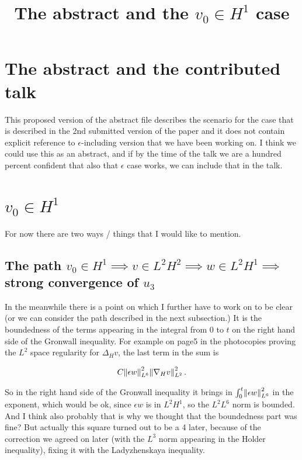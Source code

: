 \documentclass[11pt]{article}
\title{The abstract and the $v_0 \in H^1$ case}
\date{}
\begin{document}
\maketitle

\section{The abstract and the contributed talk}

This proposed version of the abstract file describes the scenario for the case that is described in the 2nd submitted version of the paper and it does not contain explicit reference to $\epsilon$-including version that we have been working on. I think we could use this as an abstract, and if by the time of the talk we are a hundred percent confident that also that $\epsilon$ case works, we can include that in the talk.

\section{$v_0 \in H^1$}

For now there are two ways / things that I would like to mention.

  \subsection{The path $v_0 \in H^1 \implies v \in L^2 H^2 \implies w \in L^2 H^1 \implies$ strong convergence of $u_3$}
  
  In the meanwhile there is a point on which I further have to work on to be clear (or we can consider the path described in the next subsection.) It is the boundedness of the terms appearing in the integral from $0$ to $t$ on the right hand side of the Gronwall inequality. For example on page5 in the photocopies proving the $L^2$ space regularity for $\Delta_H v$, the last term in the sum is
  
  $$ C \norm{\epsilon w}_{L^6}^2 \norm{\nabla_H v}_{L^2}^2.$$
  
So in the right hand side of the Gronwall inequality it brings in $\int_0 ^ t \norm{\epsilon w}_{L^6}^2$ in the exponent, which would be ok, since $\epsilon w$ is in $L^2 H^1$, so the $L^2 L^6$ norm is bounded.
And I think also probably that is why we thought that the boundedness part was fine? But actually this square turned out to be a 4 later, because of the correction we agreed on later (with the $L^3$ norm appearing in the Holder inequality), fixing it with the Ladyzhenskaya inequality.
\end{document}
